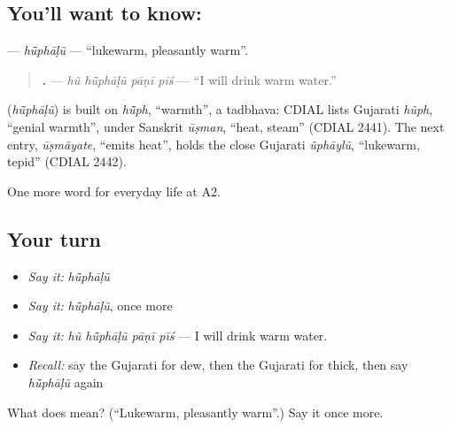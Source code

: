 \subsection*{You'll want to know: }
\textbf{} — \emph{hū̃phāḷũ} — \textquotedblleft{}lukewarm, pleasantly warm\textquotedblright{}.

\begin{quote}
\textbf{   .} — \emph{hũ hū̃phāḷũ pāṇī pīś} — \textquotedblleft{}I will drink warm water.\textquotedblright{}
\end{quote}

\begin{cousinweb}
\textbf{} (\emph{hū̃phāḷũ}) is built on \emph{hū̃ph}, \textquotedblleft{}warmth\textquotedblright{}, a tadbhava: CDIAL lists Gujarati \emph{hũph}, \textquotedblleft{}genial warmth\textquotedblright{}, under Sanskrit \emph{ūṣman}, \textquotedblleft{}heat, steam\textquotedblright{} (CDIAL 2441). The next entry, \emph{ūṣmāyate}, \textquotedblleft{}emits heat\textquotedblright{}, holds the close Gujarati \emph{ũphāylũ}, \textquotedblleft{}lukewarm, tepid\textquotedblright{} (CDIAL 2442).
\end{cousinweb}

\begin{grammarlens}[title={What you've built}]
One more word for everyday life at A2.
\end{grammarlens}

\subsection*{Your turn}
\begin{itemize}
\raggedright
  \item \emph{Say it:} \emph{hū̃phāḷũ}
  \item \emph{Say it:} \emph{hū̃phāḷũ}, once more
  \item \emph{Say it:} \emph{hũ hū̃phāḷũ pāṇī pīś} — I will drink warm water.
  \item \emph{Recall:} say the Gujarati for dew, then the Gujarati for thick, then say \emph{hū̃phāḷũ} again
\end{itemize}

\begin{tcolorbox}[breakable,colback=teal!4,colframe=teal!35!black,title={Before you move on}]
What does  mean? (\textquotedblleft{}Lukewarm, pleasantly warm\textquotedblright{}.) Say it once more.
\end{tcolorbox}
